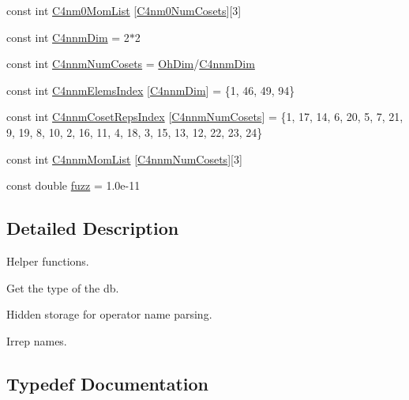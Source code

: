 \begin{DoxyCompactItemize}
\item 
const int \mbox{\hyperlink{namespaceHadron_a09e727ed9485ae1b66ca52813ac86201}{C4nm0\+Mom\+List}} \mbox{[}\mbox{\hyperlink{namespaceHadron_a8e76f646995d145588abe6831d8e9041}{C4nm0\+Num\+Cosets}}\mbox{]}\mbox{[}3\mbox{]}
\item 
const int \mbox{\hyperlink{namespaceHadron_af60ad76cc44b9d853ae699af88a1a5cb}{C4nnm\+Dim}} = 2$\ast$2
\item 
const int \mbox{\hyperlink{namespaceHadron_a016c7cde3e8e01232fb1cfc3db8d8b54}{C4nnm\+Num\+Cosets}} = \mbox{\hyperlink{namespaceHadron_a2bea98b7ecd13619ef78b6d204d59707}{Oh\+Dim}}/\mbox{\hyperlink{namespaceHadron_af60ad76cc44b9d853ae699af88a1a5cb}{C4nnm\+Dim}}
\item 
const int \mbox{\hyperlink{namespaceHadron_a6352bd80b67b77534019070d2e8ada82}{C4nnm\+Elems\+Index}} \mbox{[}\mbox{\hyperlink{namespaceHadron_af60ad76cc44b9d853ae699af88a1a5cb}{C4nnm\+Dim}}\mbox{]} = \{1, 46, 49, 94\}
\item 
const int \mbox{\hyperlink{namespaceHadron_a45efc71874946f8e0f89c14717a06a68}{C4nnm\+Coset\+Reps\+Index}} \mbox{[}\mbox{\hyperlink{namespaceHadron_a016c7cde3e8e01232fb1cfc3db8d8b54}{C4nnm\+Num\+Cosets}}\mbox{]} = \{1, 17, 14, 6, 20, 5, 7, 21, 9, 19, 8, 10, 2, 16, 11, 4, 18, 3, 15, 13, 12, 22, 23, 24\}
\item 
const int \mbox{\hyperlink{namespaceHadron_a2ec1cded04eb336aa68867febe1878cb}{C4nnm\+Mom\+List}} \mbox{[}\mbox{\hyperlink{namespaceHadron_a016c7cde3e8e01232fb1cfc3db8d8b54}{C4nnm\+Num\+Cosets}}\mbox{]}\mbox{[}3\mbox{]}
\item 
const double \mbox{\hyperlink{namespaceHadron_a3ad10e2a91a0e758b6b378c0c2f57fc8}{fuzz}} = 1.\+0e-\/11
\end{DoxyCompactItemize}


\subsection{Detailed Description}
Helper functions. 

Get the type of the db.

Hidden storage for operator name parsing.

Irrep names. 

\subsection{Typedef Documentation}
\mbox{\label{namespaceHadron_abaab2f90393b8dd8d93060e6ce6568e7}} 
